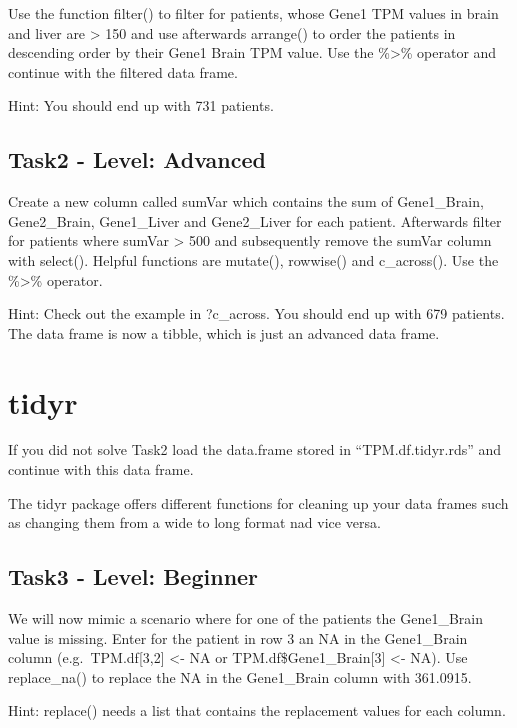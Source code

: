 \documentclass[
  7pt,
]{article}
\begin{document}
Use the function filter() to filter for patients, whose Gene1 TPM values
in brain and liver are \textgreater{} 150 and use afterwards arrange()
to order the patients in descending order by their Gene1 Brain TPM
value. Use the \%\textgreater\% operator and continue with the filtered
data frame.

Hint: You should end up with 731 patients.

\hypertarget{task2---level-advanced}{%
\subsection{Task2 - Level: Advanced}\label{task2---level-advanced}}

Create a new column called sumVar which contains the sum of
Gene1\_Brain, Gene2\_Brain, Gene1\_Liver and Gene2\_Liver for each
patient. Afterwards filter for patients where sumVar \textgreater{} 500
and subsequently remove the sumVar column with select(). Helpful
functions are mutate(), rowwise() and c\_across(). Use the
\%\textgreater\% operator.

Hint: Check out the example in ?c\_across. You should end up with 679
patients. The data frame is now a tibble, which is just an advanced data
frame.

\hypertarget{tidyr}{%
\section{tidyr}\label{tidyr}}

If you did not solve Task2 load the data.frame stored in
``TPM.df.tidyr.rds'' and continue with this data frame.

The tidyr package offers different functions for cleaning up your data
frames such as changing them from a wide to long format nad vice versa.

\hypertarget{task3---level-beginner}{%
\subsection{Task3 - Level: Beginner}\label{task3---level-beginner}}

We will now mimic a scenario where for one of the patients the
Gene1\_Brain value is missing. Enter for the patient in row 3 an NA in
the Gene1\_Brain column (e.g.~TPM.df{[}3,2{]} \textless- NA or
TPM.df\$Gene1\_Brain{[}3{]} \textless- NA). Use replace\_na() to replace
the NA in the Gene1\_Brain column with 361.0915.

Hint: replace() needs a list that contains the replacement values for
each column.
\end{document}
